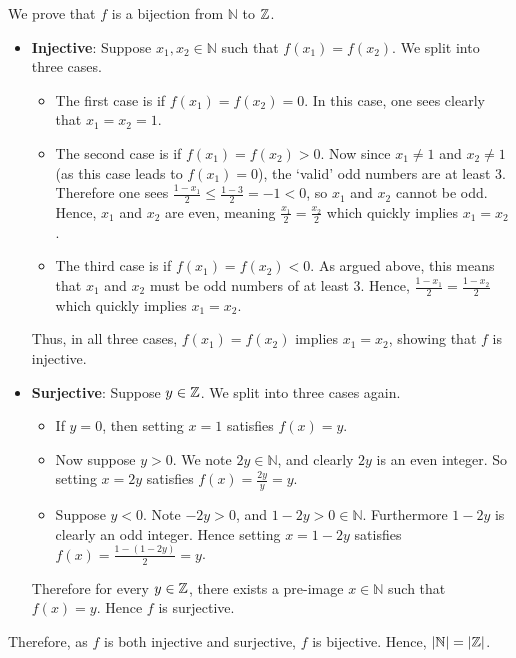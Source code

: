 \begin{questions}
    \item We prove that $f$ is a bijection from $\mathbb{N}$ to $\mathbb{Z}$.
    \begin{itemize}
        \item \textbf{Injective}: Suppose $x_1, x_2 \in \mathbb{N}$ such that $f(x_1) = f(x_2)$. We split into three cases.
        \begin{itemize}
            \item The first case is if $f(x_1) = f(x_2) = 0$. In this case, one sees clearly that $x_1 = x_2 = 1$.
            \item The second case is if $f(x_1) = f(x_2) > 0$. Now since $x_1 \neq 1$ and $x_2 \neq 1$ (as this case leads to $f(x_1) = 0$), the `valid' odd numbers are at least 3. Therefore one sees $\frac{1-x_1}{2} \leq \frac{1-3}{2} = -1 < 0$, so $x_1$ and $x_2$ cannot be odd. Hence, $x_1$ and $x_2$ are even, meaning $\frac{x_1}{2} = \frac{x_2}{2}$ which quickly implies $x_1 = x_2$.
            \item The third case is if $f(x_1) = f(x_2) < 0$. As argued above, this means that $x_1$ and $x_2$ must be odd numbers of at least 3. Hence, $\frac{1-x_1}{2} = \frac{1-x_2}{2}$ which quickly implies $x_1 = x_2$.
        \end{itemize}
        Thus, in all three cases, $f(x_1) = f(x_2)$ implies $x_1 = x_2$, showing that $f$ is injective.

        \item \textbf{Surjective}: Suppose $y \in \mathbb{Z}$. We split into three cases again.
        \begin{itemize}
            \item If $y = 0$, then setting $x = 1$ satisfies $f(x) = y$.
            \item Now suppose $y > 0$. We note $2y \in \mathbb{N}$, and clearly $2y$ is an even integer. So setting $x = 2y$ satisfies $f(x) = \frac{2y}{y} = y$.
            \item Suppose $y < 0$. Note $-2y > 0$, and $1 - 2y > 0 \in \mathbb{N}$. Furthermore $1 - 2y$ is clearly an odd integer. Hence setting $x = 1 - 2y$ satisfies $f(x) = \frac{1-(1-2y)}{2} = y$.
        \end{itemize}
        Therefore for every $y \in \mathbb{Z}$, there exists a pre-image $x \in \mathbb{N}$ such that $f(x) = y$. Hence $f$ is surjective.
    \end{itemize}
    Therefore, as $f$ is both injective and surjective, $f$ is bijective. Hence, $|\mathbb{N}| = |\mathbb{Z}|$.
\end{questions}


